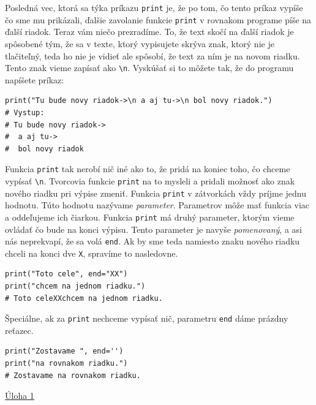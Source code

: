 \documentclass{article}
\begin{document}
Posledná vec, ktorá sa týka príkazu \texttt{print} je, že po tom, čo tento príkaz vypíše čo sme mu prikázali, ďalšie zavolanie funkcie \texttt{print} v rovnakom programe píše na ďalší riadok. Teraz vám niečo prezradíme. To, že text skočí na ďalší riadok je spôsobené tým, že sa v texte, ktorý vypisujete skrýva znak, ktorý nie je tlačiteľný, teda ho nie je vidieť ale spôsobí, že text za ním je na novom riadku. Tento znak vieme zapísať ako \texttt{\textbackslash n}. Vyskúšať si to môžete tak, že do programu napíšete príkaz:

\begin{lstlisting}
print("Tu bude novy riadok->\n a aj tu->\n bol novy riadok.")
# Vystup:
# Tu bude novy riadok->
#  a aj tu->
#  bol novy riadok
\end{lstlisting}


Funkcia \texttt{print} tak nerobí nič iné ako to, že pridá na koniec toho, čo chceme vypísať \texttt{\textbackslash n}. Tvorcovia funkcie \texttt{print} na to mysleli a pridali možnosť ako znak nového riadku pri výpise zmeniť. Funkcia \texttt{print} v zátvorkách vždy príjme jednu hodnotu. Túto hodnotu nazývame \textit{parameter}. Parametrov môže mať funkcia viac a oddeľujeme ich čiarkou. Funkcia \texttt{print} má druhý parameter, ktorým vieme ovládať čo bude na konci výpisu. Tento parameter je navyše \textit{pomenovaný}, a asi nás neprekvapí, že sa volá \texttt{end}. Ak by sme teda namiesto znaku nového riadku chceli na konci dve \texttt{X}, spravíme to nasledovne.

\begin{lstlisting}
print("Toto cele", end="XX")
print("chcem na jednom riadku.")
# Toto celeXXchcem na jednom riadku.
\end{lstlisting}

Špeciálne, ak za \texttt{print} nechceme vypísať nič, parametru \texttt{end} dáme prázdny reťazec.
\begin{lstlisting}
print("Zostavame ", end='')
print("na rovnakom riadku.")
# Zostavame na rovnakom riadku.
\end{lstlisting}

\href{https://testovac.ksp.sk/tasks/ls-uvod-ahoj/}{Úloha 1}
\end{document}

